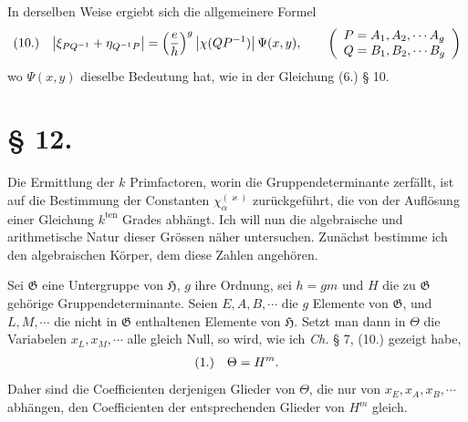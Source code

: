 \documentclass[11pt]{article}
\makeatletter
\newcommand{\Hgrp}{\mathfrak{H}}
\newcommand{\Ggrp}{\mathfrak{G}}
\newcommand{\frobtag}[2]{\[\begin{array}{@{}r@{\quad}l@{}}\textup{(#1)} & \displaystyle #2\end{array}\]}
\newcommand{\frobtagc}[2]{\[\begin{array}{@{}r@{\quad}c@{}}\textup{(#1)} & \displaystyle #2\end{array}\]}
\makeatother
\begin{document}
In derselben Weise ergiebt sich die allgemeinere Formel
\frobtag{10.}{\left|\xi_{PQ^{-1}}+\eta_{Q^{-1}P}\right|=\left(\frac{e}{h}\right)^g\left|\chi(QP^{-1})\right|\Psi(x,y),\qquad \left(\begin{array}{l}P=A_1,A_2,\cdots A_g\\ Q=B_1,B_2,\cdots B_g\end{array}\right)}
wo $\Psi(x,y)$ dieselbe Bedeutung hat, wie in der Gleichung (6.) § 10.

\section*{§ 12.}

Die Ermittlung der $k$ Primfactoren, worin die Gruppendeterminante zerfällt, ist auf die Bestimmung der Constanten $\chi_\alpha^{(\varkappa)}$ zurückgeführt, die von der Auflösung einer Gleichung $k^{\mathrm{ten}}$ Grades abhängt. Ich will nun die algebraische und arithmetische Natur dieser Grössen näher untersuchen. Zunächst bestimme ich den algebraischen Körper, dem diese Zahlen angehören.

Sei $\Ggrp$ eine Untergruppe von $\Hgrp$, $g$ ihre Ordnung, sei $h=gm$ und $H$ die zu $\Ggrp$ gehörige Gruppendeterminante. Seien $E,A,B,\cdots$ die $g$ Elemente von $\Ggrp$, und $L,M,\cdots$ die nicht in $\Ggrp$ enthaltenen Elemente von $\Hgrp$. Setzt man dann in $\Theta$ die Variabelen $x_L,x_M,\cdots$ alle gleich Null, so wird, wie ich \emph{Ch.} § 7, (10.) gezeigt habe,
\frobtagc{1.}{\Theta=H^m.}
Daher sind die Coefficienten derjenigen Glieder von $\Theta$, die nur von $x_E,x_A,x_B,\cdots$ abhängen, den Coefficienten der entsprechenden Glieder von $H^m$ gleich.
\end{document}
